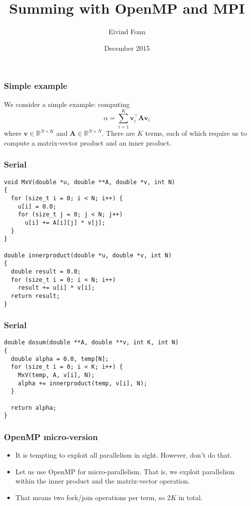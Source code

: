 

\title{Summing with OpenMP and MPI}
\author{Eivind Fonn}
\date{December 2015}
\maketitle

\begin{frame}
  \frametitle{Simple example}
  We consider a simple example: computing
  \[
    \alpha = \sum_{i=1}^K \bm v_i^\intercal \bm A \bm v_i
  \]
  where $\bm v \in \mathbb{R}^{N \times K}$ and
  $\bm A \in \mathbb{R}^{N \times N}$. There are $K$ terms, each of which
  require us to compute a matrix-vector product and an inner product.
\end{frame}

\begin{frame}[fragile]
  \frametitle{Serial}
\begin{lstlisting}[style=c, basicstyle=\ttfamily\footnotesize]
void MxV(double *u, double **A, double *v, int N)
{
  for (size_t i = 0; i < N; i++) {
    u[i] = 0.0;
    for (size_t j = 0; j < N; j++)
      u[i] += A[i][j] * v[j];
  }
}

double innerproduct(double *u, double *v, int N)
{
  double result = 0.0;
  for (size_t i = 0; i < N; i++)
    result += u[i] * v[i];
  return result;
}
\end{lstlisting}
\end{frame}

\begin{frame}[fragile]
  \frametitle{Serial}
\begin{lstlisting}[style=c]
double dosum(double **A, double **v, int K, int N)
{
  double alpha = 0.0, temp[N];
  for (size_t i = 0; i < K; i++) {
    MxV(temp, A, v[i], N);
    alpha += innerproduct(temp, v[i], N);
  }

  return alpha;
}
\end{lstlisting}
\end{frame}

\begin{frame}
  \frametitle{OpenMP micro-version}
  \begin{itemize}
  \item It is tempting to exploit all parallelism in sight. However, don't do
    that.
  \item Let us use OpenMP for micro-parallelism. That is, we exploit parallelism
    within the inner product and the matrix-vector operation.
  \item That means two fork/join operations per term, so $2K$ in total.
  \end{itemize}
\end{frame}

